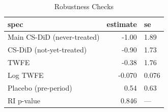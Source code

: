 \begin{table}[!h]
\centering
\caption{\label{tab:robustness}Robustness Checks}
\centering
\begin{tabular}[t]{lrl}
\toprule
spec & estimate & se\\
\midrule
Main CS-DiD (never-treated) & -1.00 & 1.89\\
CS-DiD (not-yet-treated) & -0.90 & 1.73\\
TWFE & -0.38 & 1.76\\
Log TWFE & -0.070 & 0.076\\
Placebo (pre-period) & 0.54 & 0.63\\
\addlinespace
RI p-value & 0.846 & ---\\
\bottomrule
\end{tabular}
\end{table}
